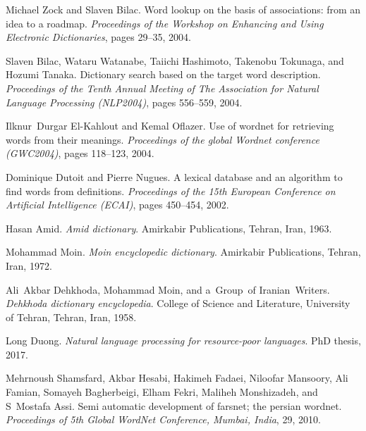 \documentclass{article}
\begin{document}
\begin{thebibliography}{45}
Michael Zock and Slaven Bilac.
\newblock Word lookup on the basis of associations: from an idea to a roadmap.
\newblock \emph{Proceedings of the Workshop on Enhancing and Using Electronic
  Dictionaries}, pages 29--35, 2004.

Slaven Bilac, Wataru Watanabe, Taiichi Hashimoto, Takenobu Tokunaga, and Hozumi
  Tanaka.
\newblock Dictionary search based on the target word description.
\newblock \emph{Proceedings of the Tenth Annual Meeting of The Association for
  Natural Language Processing (NLP2004)}, pages 556--559, 2004.

Ilknur~Durgar El-Kahlout and Kemal Oflazer.
\newblock Use of wordnet for retrieving words from their meanings.
\newblock \emph{Proceedings of the global Wordnet conference (GWC2004)}, pages
  118--123, 2004.

Dominique Dutoit and Pierre Nugues.
\newblock A lexical database and an algorithm to find words from definitions.
\newblock \emph{Proceedings of the 15th European Conference on Artificial Intelligence (ECAI)}, pages 450--454, 2002.

Hasan Amid.
\newblock \emph{Amid dictionary}.
\newblock Amirkabir Publications, Tehran, Iran, 1963.

Mohammad Moin.
\newblock \emph{Moin encyclopedic dictionary}.
\newblock Amirkabir Publications, Tehran, Iran, 1972.

Ali~Akbar Dehkhoda, Mohammad Moin, and a~Group~of Iranian~Writers.
\newblock \emph{Dehkhoda dictionary encyclopedia}.
\newblock College of Science and Literature, University of Tehran, Tehran,
  Iran, 1958.

Long Duong.
\newblock \emph{Natural language processing for resource-poor languages}.
\newblock PhD thesis, 2017.

Mehrnoush Shamsfard, Akbar Hesabi, Hakimeh Fadaei, Niloofar Mansoory, Ali
  Famian, Somayeh Bagherbeigi, Elham Fekri, Maliheh Monshizadeh, and S~Mostafa
  Assi.
\newblock Semi automatic development of farsnet; the persian wordnet.
\newblock \emph{Proceedings of 5th Global WordNet Conference, Mumbai, India},
  29, 2010.


\end{thebibliography}
\end{document}
